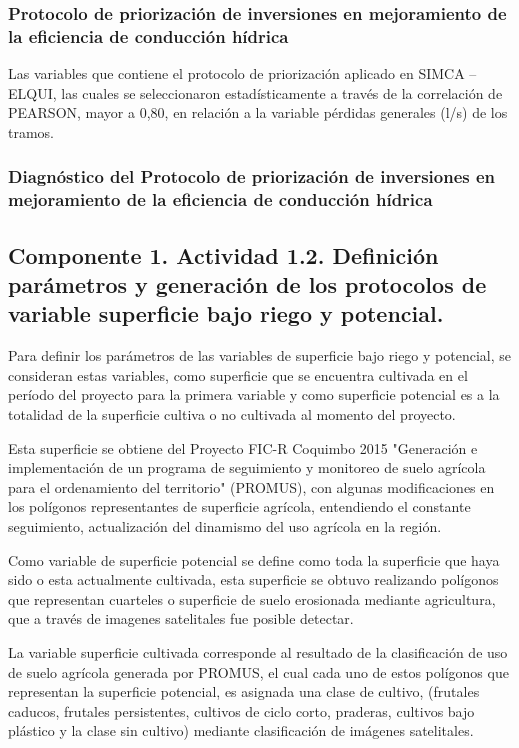 \documentclass[]{article}
\begin{document}
\subsubsection{Protocolo de priorización de inversiones en mejoramiento de la eficiencia de conducción hídrica}

Las variables que contiene el protocolo de priorización aplicado en SIMCA – ELQUI, las cuales se seleccionaron estadísticamente a través de la correlación de PEARSON, mayor a 0,80, en relación a la variable pérdidas generales (l/s) de los tramos.

\subsubsection{Diagnóstico del Protocolo de priorización de inversiones en mejoramiento de la eficiencia de conducción hídrica}



\subsection{Componente 1. Actividad 1.2. Definición parámetros y generación de los protocolos de variable superficie bajo riego y potencial.}

Para definir los parámetros de las variables de superficie bajo riego y potencial, se consideran estas variables, como superficie que se encuentra cultivada en el período del proyecto para la primera variable y como superficie potencial es a la totalidad de la superficie cultiva o no cultivada al momento del proyecto.

Esta superficie se obtiene del Proyecto FIC-R Coquimbo 2015 "Generación e implementación de un programa de seguimiento y monitoreo de suelo agrícola para el ordenamiento del territorio" (PROMUS), con algunas modificaciones en los polígonos representantes de superficie agrícola, entendiendo el constante seguimiento, actualización del dinamismo del uso agrícola en la región.

Como variable de superficie potencial se define como toda la superficie que haya sido o esta actualmente cultivada, esta superficie se obtuvo realizando polígonos que representan cuarteles o superficie de suelo erosionada mediante agricultura, que a través de imagenes satelitales fue posible detectar.

La variable superficie cultivada corresponde al resultado de la clasificación de uso de suelo agrícola generada por PROMUS, el cual cada uno de estos polígonos que representan la superficie potencial, es asignada una clase de cultivo, (frutales caducos, frutales persistentes, cultivos de ciclo corto, praderas, cultivos bajo plástico y la clase sin cultivo) mediante clasificación de imágenes satelitales.
\end{document}
